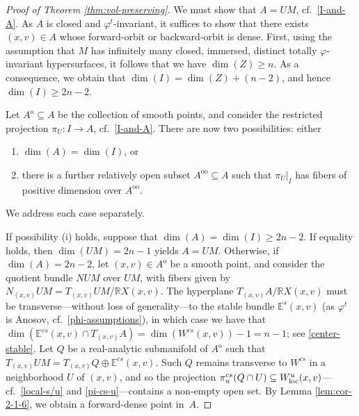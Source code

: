 \documentclass[10pt,a4paper]{amsart}
\numberwithin{equation}{section}
\theoremstyle{definition}
\begin{document}
\begin{proof}[Proof of Theorem \ref{thm:vol-preserving}]
 We must show that $A=UM$, cf.\ \eqref{I-and-A}. As $A$ is closed and \mbox{$\varphi^t$-invariant}, it suffices to show that there exists $(x,v) \in A$ whose forward-orbit or backward-orbit is dense. First, using the assumption that $M$ has infinitely many closed, immersed, distinct totally \mbox{$\varphi$-invariant} hypersurfaces, it follows that we have $\dim(Z) \geq n$. As a consequence, we obtain that \mbox{$\dim(I) = \dim(Z) + (n-2)$}, and hence $\dim(I) \geq 2n-2$.

 Let $A^{\mathrm{o}} \subseteq A$ be the collection of smooth points, and consider the restricted projection \mbox{$\pi_U \colon I \rightarrow A$}, cf.\ \eqref{I-and-A}. There are now two possibilities: either
 \begin{enumerate}[\normalfont(i)]\itemsep=0pt
\item $\dim(A) = \dim(I)$, or \item there is a further relatively open subset $A^{\mathrm{o} \mathrm{o}} \subseteq A$ such that $\pi_U|_I$ has fibers of positive dimension over $A^{\mathrm{o} \mathrm{o}}$.
\end{enumerate} We address each case separately.

 If possibility (i) holds, suppose that $\dim(A) = \dim(I) \geq 2n-2$. If equality holds, then $\dim(UM) = 2n-1$ yields $A = UM$. Otherwise, if $\dim(A) = 2n-2$, let $(x,v) \in A^{\mathrm{o}}$ be a smooth point, and consider the quotient bundle $NUM$ over $UM$, with fibers given by ${N_{(x,v)}UM = T_{(x,v)}UM/\mathbb{R}X(x,v)}$. The hyperplane $T_{(x,v)}A/\mathbb{R} X(x,v)$ must be transverse---with\-out loss of generality---to the stable bundle $\mathbb{E}^{s}(x,v)$ (as $\varphi^t$ is Anosov, cf.\ \eqref{phi-assumptions}), in which case we have that $\dim(\mathbb{E}^{cs}(x,v) \cap T_{(x,v)}A) = \dim(W^{cs}(x,v)) - 1 = n-1$; see \eqref{center-stable}. Let $Q$ be a real-analytic submanifold of $A^{\mathrm{o}}$ such that $T_{(x,v)}UM = T_{(x,v)}Q \oplus \mathbb{E}^{cs}(x,v)$. Such $Q$ remains transverse to $W^{cs}$ in a neighborhood $U$ of $(x,v)$, and so the projection $\pi_u^{cs}(Q \cap U) \subseteq W^u_{\rm loc}(x,v)$---cf.\ \eqref{local-s/u} and \eqref{pi-cs-u}---contains a non-empty open set. By Lemma \ref{lem:cor-2-1-6}, we obtain a forward-dense point in~$A$.


\end{proof}
\end{document}
